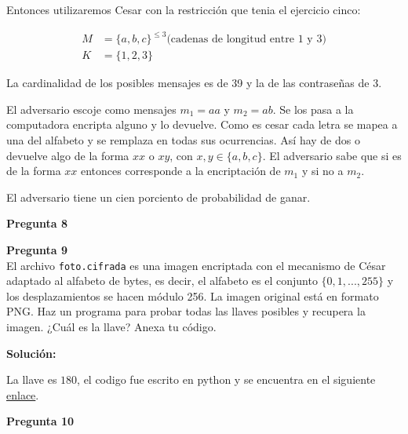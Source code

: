 \documentclass{article}
\newenvironment{problem}[2][Pregunta]
    { \begin{mdframed}[backgroundcolor=gray!20] \textbf{#1 #2} \\}
    {  \end{mdframed}}
\begin{document}
Entonces utilizaremos Cesar con la restricción que tenia el ejercicio cinco:

\begin{align*}
  M &= \{a,b,c\}^{\leq 3} \text{(cadenas de longitud entre $1$ y $3$)}\\
  K &= \{1,2,3\}
\end{align*}

La cardinalidad de los posibles mensajes es de 39 y la de las contraseñas de 3.

El adversario escoje como mensajes $m_1 = aa$ y $m_2=ab$. Se los pasa a la computadora
encripta alguno y lo devuelve. Como es cesar cada letra se mapea a una del alfabeto y se
remplaza en todas sus ocurrencias. Así hay de dos o devuelve algo de la forma
$xx$ o $xy$, con $x,y\in \{a,b,c\}$. El adversario sabe que si es de la forma
$xx$ entonces corresponde a la encriptación de $m_1$ y si no a $m_2$.

El adversario tiene un cien porciento de probabilidad de ganar.
  
\begin{problem}{8}
  
\end{problem}

\begin{problem}{9}
  El archivo {\tt foto.cifrada} es una imagen encriptada con el mecanismo de César adaptado al
  alfabeto de bytes, es decir, el alfabeto es el conjunto $\{0,1,. . ., 255\}$ y los
  desplazamientos se hacen módulo 256. La imagen original está en formato PNG. Haz un programa
  para probar todas las llaves posibles y recupera la imagen. ¿Cuál es la llave? Anexa tu código.
\end{problem}

{\bf Solución:}

La llave es $180$, el codigo fue escrito en python y se encuentra en el siguiente
\href{https://github.com/DiegoMendezMedina/Cripto-Seguridad/tree/main/Tareas/01/src/9.py}{enlace}.

\begin{problem}{10}
  
\end{problem}
\end{document}
